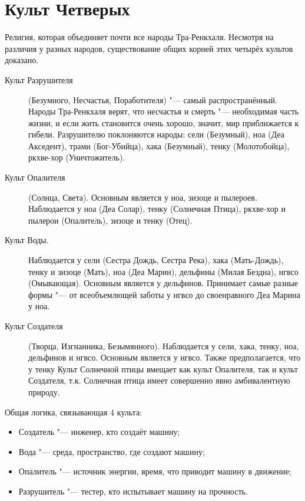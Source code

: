 \section{Культ Четверых}

Религия, которая объединяет почти все народы Тра-Ренкхаля.
Несмотря на различия у разных народов, существование общих корней этих четырёх культов доказано.

\begin{description}
\item[Культ Разрушителя] (Безумного, Несчастья, Поработителя) "--- самый распространённый.
Народы Тра-Ренкхаля верят, что несчастья и смерть "--- необходимая часть жизни, и если жить становится очень хорошо, значит, мир приближается к гибели.
Разрушителю поклоняются народы: сели (Безумный), ноа (Деа Акседент), трами (Бог-Убийца), хака (Безумный), тенку (Молотобойца), ркхве-хор (Уничтожитель).

\item[Культ Опалителя] (Солнца, Света).
Основным является у ноа, зизоце и пылероев.
Наблюдается у ноа (Деа Солар), тенку (Солнечная Птица), ркхве-хор и пылерои (Опалитель), зизоце и тенку (Отец).

\item[Культ Воды.] Наблюдается у сели (Сестра Дождь, Сестра Река), хака (Мать-Дождь), тенку и зизоце (Мать), ноа (Деа Марин), дельфины (Милая Бездна), нгвсо (Омывающая).
Основным является у дельфинов. Принимает самые разные формы "--- от всеобъемлющей заботы у нгвсо до своенравного Деа Марина у ноа.

\item[Культ Создателя] (Творца, Изгнанника, Безымянного).
Наблюдается у сели, хака, тенку, ноа, дельфинов и нгвсо.
Основным является у нгвсо.
Также предполагается, что у тенку Культ Солнечной птицы вмещает как культ Опалителя, так и культ Создателя, т.к. Солнечная птица имеет совершенно явно амбивалентную природу.
\end{description}

Общая логика, связывающая 4 культа:

\begin{itemize}
\item Создатель "--- инженер, кто создаёт машину;
\item Вода "--- среда, пространство, где создают машину;
\item Опалитель "--- источник энергии, время, что приводит машину в движение;
\item Разрушитель "--- тестер, кто испытывает машину на прочность.
\end{itemize}


